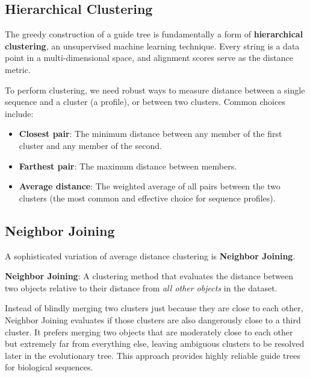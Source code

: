 \subsection{Hierarchical Clustering}
The greedy construction of a guide tree is fundamentally a form of \textbf{hierarchical clustering}, an unsupervised machine learning technique. Every string is a data point in a multi-dimensional space, and alignment scores serve as the distance metric.


To perform clustering, we need robust ways to measure distance between a single sequence and a cluster (a profile), or between two clusters. Common choices include:
\begin{itemize}
  \item \textbf{Closest pair}: The minimum distance between any member of the first cluster and any member of the second.
  \item \textbf{Farthest pair}: The maximum distance between members.
  \item \textbf{Average distance}: The weighted average of all pairs between the two clusters (the most common and effective choice for sequence profiles).
\end{itemize}

\subsection{Neighbor Joining}
A sophisticated variation of average distance clustering is \textbf{Neighbor Joining}. 
\begin{important}
  \textbf{Neighbor Joining}: A clustering method that evaluates the distance between two objects relative to their distance from \textit{all other objects} in the dataset.
\end{important}

Instead of blindly merging two clusters just because they are close to each other, Neighbor Joining evaluates if those clusters are also dangerously close to a third cluster. It prefers merging two objects that are moderately close to each other but extremely far from everything else, leaving ambiguous clusters to be resolved later in the evolutionary tree. This approach provides highly reliable guide trees for biological sequences.


